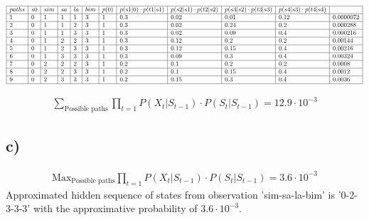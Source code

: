 $
\scalemath{0.75}{
\begin{array}
	{ | l | l | l | l | l | l | l | l | l | l | l | l | }
	\hline
	paths & s0 & sim & sa & la & bim & p(0)  & p(s1|0) \cdot p(t1|s1)  & p(s2|s1) \cdot p(t2|s2) & p(s3|s2) \cdot p(t3|s3)  & p(s4|s3) \cdot p(t4|s4)  & \  \\ \hline
	1 & 0 & 1 & 1 & 1 & 3 & 1 & 0.3 & 0.02 & 0.01 & 0.12 & 0.0000072 \\ \hline
	2 & 0 & 1 & 1 & 2 & 3 & 1 & 0.3 & 0.02 & 0.24 &	0.2 &	0.000288 \\ \hline
	3 & 0 & 1 & 1 & 3 & 3 & 1 & 0.3 & 0.02 & 0.09 & 0.4 & 0.000216 \\ \hline
	4 & 0 & 1 & 2 & 2 & 3 & 1 & 0.3 & 0.12 & 0.2 & 0.2 & 0.00144 \\ \hline
	5 & 0 & 1 & 2 & 3 & 3 & 1 & 0.3 & 0.12 & 0.15 & 0.4 & 0.00216 \\ \hline
	6 & 0 & 1 & 3 & 3 & 3 & 1 & 0.3 & 0.09 & 0.3 & 0.4 & 0.00324 \\ \hline
	7 & 0 & 2 & 2 & 2 & 3 & 1 & 0.2 & 0.1 & 0.2 & 0.2 & 0.0008 \\ \hline
	8 & 0 & 2 & 2 & 3 & 3 & 1 & 0.2 & 0.1 & 0.15 & 0.4 & 0.0012 \\ \hline
	9 & 0 & 2 & 3 & 3 & 3 & 1 & 0.2 & 0.15 & 0.3 & 0.4 & 0.0036 \\ \hline
\end{array}
}
$

\begin{align*}
\sum_\text{Possible paths}  \prod_{t=1} P(X_{t}|S_{t-1}) \cdot P(S_{t}|S_{t-1}) = 12.9 \cdot 10^{-3}
\end{align*}

\subsection*{c)} %
\label{sub:c}
\begin{align*}	
	\text{Max} _\text{Possible paths} {\prod_{t=1}P(X_{t}|S_{t-1}) \cdot P(S_{t}|S_{t-1})} = 3.6 \cdot 10^{-3}
\end{align*}
Approximated hidden sequence of states from observation 'sim-sa-la-bim' is '0-2-3-3-3' with the approximative probability of $3.6 \cdot 10^{-3}$. 


